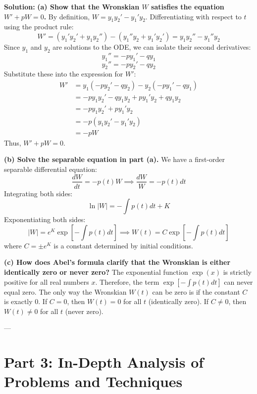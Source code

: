 \documentclass{article}
\begin{document}
\textbf{Solution:}
\textbf{(a) Show that the Wronskian $W$ satisfies the equation $W' + pW = 0$.}
By definition, $W = y_1 y_2' - y_1' y_2$.
Differentiating with respect to $t$ using the product rule:
\[ W' = (y_1' y_2' + y_1 y_2'') - (y_1'' y_2 + y_1' y_2') = y_1 y_2'' - y_1'' y_2 \]
Since $y_1$ and $y_2$ are solutions to the ODE, we can isolate their second derivatives:
\[ y_1'' = -p y_1' - q y_1 \]
\[ y_2'' = -p y_2' - q y_2 \]
Substitute these into the expression for $W'$:
\begin{align*}
W' &= y_1(-p y_2' - q y_2) - y_2(-p y_1' - q y_1) \\
&= -p y_1 y_2' - q y_1 y_2 + p y_1' y_2 + q y_1 y_2 \\
&= -p y_1 y_2' + p y_1' y_2 \\
&= -p(y_1 y_2' - y_1' y_2) \\
&= -p W
\end{align*}
Thus, $W' + pW = 0$.

\textbf{(b) Solve the separable equation in part (a).}
We have a first-order separable differential equation:
\[ \frac{dW}{dt} = -p(t)W \implies \frac{dW}{W} = -p(t) dt \]
Integrating both sides:
\[ \ln|W| = -\int p(t) dt + K \]
Exponentiating both sides:
\[ |W| = e^K \exp\left[ -\int p(t) dt \right] \implies W(t) = C \exp\left[ -\int p(t) dt \right] \]
where $C = \pm e^K$ is a constant determined by initial conditions.

\textbf{(c) How does Abel's formula clarify that the Wronskian is either identically zero or never zero?}
The exponential function $\exp(x)$ is strictly positive for all real numbers $x$. Therefore, the term $\exp\left[ -\int p(t) dt \right]$ can never equal zero. The only way the Wronskian $W(t)$ can be zero is if the constant $C$ is exactly $0$. If $C = 0$, then $W(t) = 0$ for all $t$ (identically zero). If $C \neq 0$, then $W(t) \neq 0$ for all $t$ (never zero).

---

\section{Part 3: In-Depth Analysis of Problems and Techniques}
\end{document}
